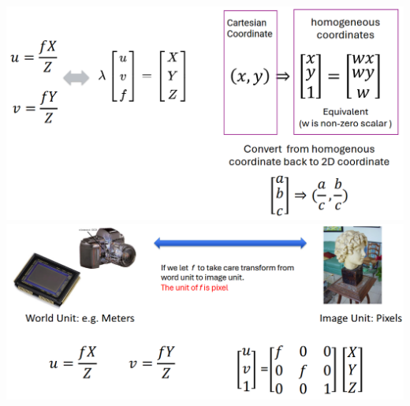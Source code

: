 \documentclass[10pt]{article}
\begin{document}
\begin{center} 
	\includegraphics*[width=\textwidth]{L1_17.png} \\
    \includegraphics*[width=\textwidth]{L1_18.png} 
\end{center}
\end{document}
